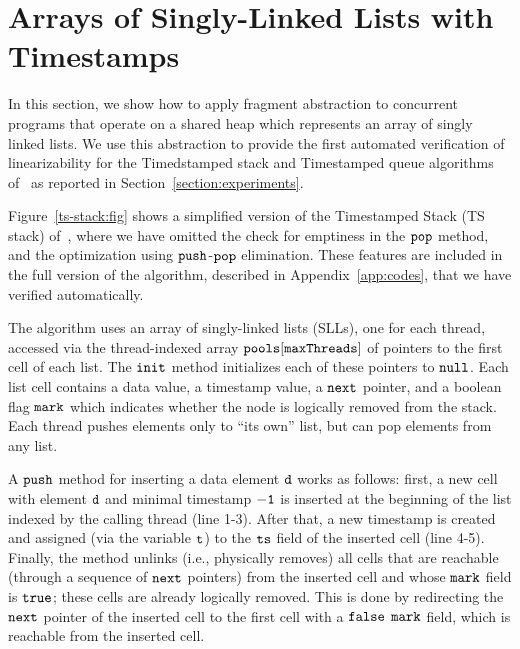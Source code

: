 \section{Arrays of Singly-Linked Lists with Timestamps}
\label{sec:ts}

In this section, we show how to apply fragment abstraction to concurrent
programs that  operate on a shared heap which represents
an array of singly linked lists.
We use this abstraction to provide the first automated verification of
linearizability for the Timedstamped stack and
Timestamped queue algorithms of~\cite{ts-stack}
as reported in Section~\ref{section:experiments}.




Figure~\ref{ts-stack:fig} shows a simplified version of the Timestamped Stack (TS stack) of~\cite{ts-stack}, where we have omitted the check for emptiness in the ${\tt pop}$ method, and the optimization using ${\tt push}$-${\tt pop}$ elimination. These features are included in the full version of the algorithm,
\ifreport
described in Appendix~\ref{app:codes},
\fi
that we have verified automatically.

The algorithm uses an array of singly-linked lists (SLLs), one for each thread, accessed via the thread-indexed array ${\tt pools[maxThreads]}$ of pointers to the first cell of each list. The ${\tt init}$ method initializes each of these pointers to ${\tt null}$. Each list cell contains a data value, a timestamp value, a ${\tt next}$ pointer, and a boolean flag ${\tt mark}$ which indicates whether the node is logically removed from the stack. Each thread pushes elements only to ``its own'' list, but can pop elements from any list.

A ${\tt push}$ method for inserting a data element ${\tt d}$ works as follows: first, a new cell with element ${\tt d}$ and minimal timestamp ${\tt -1}$ is inserted at the beginning of the list indexed by the calling thread (line 1-3). After that, a new timestamp is created and assigned (via the variable ${\tt t}$) to the ${\tt ts}$ field of the inserted cell (line 4-5).
Finally, the method unlinks (i.e., physically removes) all cells that are reachable (through a sequence of $\tt next$ pointers) from the inserted cell and whose ${\tt mark}$ field is ${\tt true}$; these cells are already logically removed. This is done by redirecting the $\tt next$ pointer of the inserted cell to the first cell with a ${\tt false}$ $\tt mark$ field, which is
reachable from the inserted cell.

